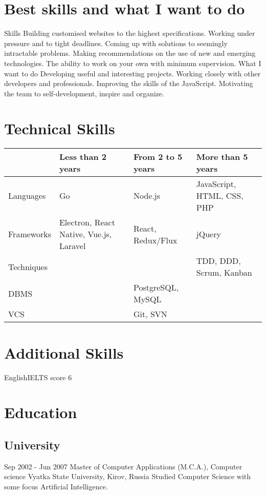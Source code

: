 \documentclass[11pt,a4paper]{moderncv}
\begin{document}
\maketitle
\section{Best skills and what I want to do}
  \cvline
    {Skills}{
      Building customised websites to the highest specifications.
      Working under pressure and to tight deadlines.
      Coming up with solutions to seemingly intractable problems.
      Making recommendations on the use of new and emerging technologies.
      The ability to work on your own with minimum supervision.}
  \cvline
    {What I want to do}{
      Developing useful and interesting projects.
      Working closely with other developers and professionals.
      Improving the skills of the JavaScript.
      Motivating the team to self-development, inspire and organize.}

\section{Technical Skills}

\begin{tabular}{ l||m{4cm}|m{4cm}|m{4cm}|  }
  & Less than 2 years & From 2 to 5 years & More than 5 years \\
  \hline\hline
  Languages & Go & Node.js & JavaScript, HTML, CSS, PHP \\
  \hline
  Frameworks & Electron, React Native, Vue.js, Laravel & React, Redux/Flux & jQuery \\
  \hline
  Techniques & & & TDD, DDD, Scrum, Kanban \\
  \hline
  DBMS & & PostgreSQL, MySQL & \\
  \hline
  VCS & & Git, SVN & \\
  \hline
\end{tabular}

\section{Additional Skills}
  \cvline
    {English}{IELTS score 6}

\section{Education}
  \subsection{University}
  \cventry
    {Sep 2002 - Jun 2007}
    {Master of Computer Applications (M.C.A.), Computer science}
    {\newline Vyatka State University, Kirov, Russia}
    {}{}
    {Studied Computer Science with some focus Artificial Intelligence.}
\end{document}
